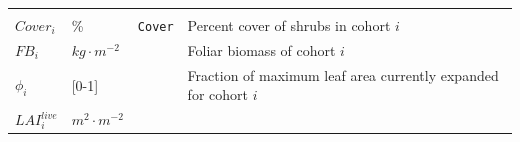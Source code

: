 \documentclass[]{book}
\begin{document}
\begin{longtable}[]{@{}llll@{}}
\begin{minipage}[t]{0.45\columnwidth}
\end{minipage}\tabularnewline
\begin{minipage}[t]{0.11\columnwidth}\raggedright\strut
\(Cover_i\)\strut
\end{minipage} & \begin{minipage}[t]{0.10\columnwidth}\raggedright\strut
\%\strut
\end{minipage} & \begin{minipage}[t]{0.12\columnwidth}\raggedright\strut
\texttt{Cover}\strut
\end{minipage} & \begin{minipage}[t]{0.45\columnwidth}\raggedright\strut
Percent cover of shrubs in cohort \(i\)\strut
\end{minipage}\tabularnewline
\begin{minipage}[t]{0.11\columnwidth}\raggedright\strut
\(FB_{i}\)\strut
\end{minipage} & \begin{minipage}[t]{0.10\columnwidth}\raggedright\strut
\(kg \cdot m^{-2}\)\strut
\end{minipage} & \begin{minipage}[t]{0.12\columnwidth}\raggedright\strut
\strut
\end{minipage} & \begin{minipage}[t]{0.45\columnwidth}\raggedright\strut
Foliar biomass of cohort \(i\)\strut
\end{minipage}\tabularnewline
\begin{minipage}[t]{0.11\columnwidth}\raggedright\strut
\(\phi_i\)\strut
\end{minipage} & \begin{minipage}[t]{0.10\columnwidth}\raggedright\strut
{[}0-1{]}\strut
\end{minipage} & \begin{minipage}[t]{0.12\columnwidth}\raggedright\strut
\strut
\end{minipage} & \begin{minipage}[t]{0.45\columnwidth}\raggedright\strut
Fraction of maximum leaf area currently expanded for cohort \(i\)\strut
\end{minipage}\tabularnewline
\begin{minipage}[t]{0.11\columnwidth}\raggedright\strut
\(LAI^{live}_i\)\strut
\end{minipage} & \begin{minipage}[t]{0.10\columnwidth}\raggedright\strut
\(m^2 \cdot m^{-2}\)\strut
\end{minipage} & \begin{minipage}[t]{0.12\columnwidth}\raggedright\strut

\end{minipage}
\end{longtable}
\end{document}
